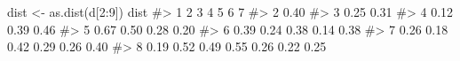 \documentclass[
  letterpaper,
]{krantz}
\makeatletter
\newenvironment{Shaded}{\begin{snugshade}}{\end{snugshade}}
\newcommand{\AttributeTok}[1]{\textcolor[rgb]{0.40,0.45,0.13}{#1}}
\newcommand{\CommentTok}[1]{\textcolor[rgb]{0.37,0.37,0.37}{#1}}
\newcommand{\DecValTok}[1]{\textcolor[rgb]{0.68,0.00,0.00}{#1}}
\newcommand{\FunctionTok}[1]{\textcolor[rgb]{0.28,0.35,0.67}{#1}}
\newcommand{\NormalTok}[1]{\textcolor[rgb]{0.00,0.23,0.31}{#1}}
\newcommand{\OtherTok}[1]{\textcolor[rgb]{0.00,0.23,0.31}{#1}}
\newcommand{\SpecialCharTok}[1]{\textcolor[rgb]{0.37,0.37,0.37}{#1}}
\newenvironment{kframe}{%
\medskip{}
\setlength{\fboxsep}{.8em}
 \def\at@end@of@kframe{}%
 \ifinner\ifhmode%
  \def\at@end@of@kframe{\end{minipage}}%
  \begin{minipage}{\columnwidth}%
 \fi\fi%
 \def\FrameCommand##1{\hskip\@totalleftmargin \hskip-\fboxsep
 \colorbox{shadecolor}{##1}\hskip-\fboxsep
     \hskip-\linewidth \hskip-\@totalleftmargin \hskip\columnwidth}%
 \MakeFramed {\advance\hsize-\width
   \@totalleftmargin\z@ \linewidth\hsize
   \@setminipage}}%
 {\par\unskip\endMakeFramed%
 \at@end@of@kframe}
\renewenvironment{Shaded}{\begin{kframe}}{\end{kframe}}
\makeatother
\begin{document}
\begin{Shaded}
\end{Shaded}

\begin{Shaded}
\begin{Highlighting}[]
\NormalTok{dist }\OtherTok{\textless{}{-}} \FunctionTok{as.dist}\NormalTok{(d[}\DecValTok{2}\SpecialCharTok{:}\DecValTok{9}\NormalTok{])}
\NormalTok{dist}
\CommentTok{\#\textgreater{}      1    2    3    4    5    6    7}
\CommentTok{\#\textgreater{} 2 0.40                              }
\CommentTok{\#\textgreater{} 3 0.25 0.31                         }
\CommentTok{\#\textgreater{} 4 0.12 0.39 0.46                    }
\CommentTok{\#\textgreater{} 5 0.67 0.50 0.28 0.20               }
\CommentTok{\#\textgreater{} 6 0.39 0.24 0.38 0.14 0.38          }
\CommentTok{\#\textgreater{} 7 0.26 0.18 0.42 0.29 0.26 0.40     }
\CommentTok{\#\textgreater{} 8 0.19 0.52 0.49 0.55 0.26 0.22 0.25}
\end{Highlighting}
\end{Shaded}
\end{document}
